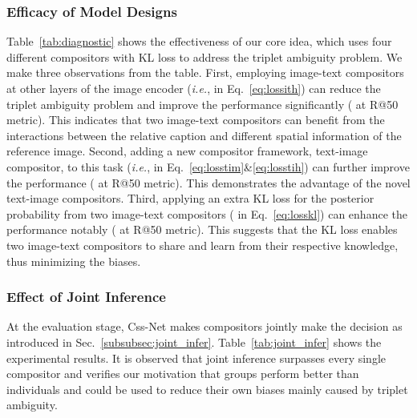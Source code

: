 \documentclass[sigconf]{acmart}
\def\ie{\emph{i.e.}}
\begin{document}
\subsubsection{Efficacy of Model Designs}

Table~\ref{tab:diagnostic} shows the effectiveness of our core idea, which uses four different compositors with KL loss to address the triplet ambiguity problem. We make three observations from the table. First, employing image-text compositors at other layers of the image encoder (\ie,  in Eq.~\ref{eq:lossith}) can reduce the triplet ambiguity problem and improve the performance significantly ( at R@50 metric). This indicates that two image-text compositors can benefit from the interactions between the relative caption and different spatial information of the reference image. Second, adding a new compositor framework, text-image compositor, to this task (\ie,  in Eq.~\ref{eq:losstim}\&\ref{eq:losstih}) can further improve the performance ( at R@50 metric). This demonstrates the advantage of the novel text-image compositors. Third, applying an extra KL loss for the posterior probability from two image-text compositors ( in Eq.~\ref{eq:losskl})  can enhance the performance notably ( at R@50 metric). This suggests that the KL loss enables two image-text compositors to share and learn from their respective knowledge, thus minimizing the biases.

\subsubsection{Effect of Joint Inference}

At the evaluation stage, Css-Net makes compositors jointly make the decision as introduced in Sec.~\ref{subsubsec:joint_infer}. Table~\ref{tab:joint_infer} shows the experimental results. It is observed that joint inference surpasses every single compositor and verifies our motivation that groups perform better than individuals and could be used to reduce their own biases mainly caused by triplet ambiguity. 
\end{document}
